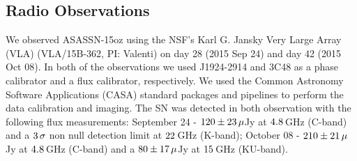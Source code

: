 \documentclass[a4paper,fleqn,usenatbib]{mnras}
\begin{document}
\subsection{Radio Observations}
We observed ASASSN-15oz using the NSF's Karl G. Jansky Very Large Array (VLA) (VLA/15B-362, PI: Valenti) on day 28 (2015 Sep 24) and day 42 (2015 Oct 08). 
In both of the observations we used J1924-2914 and 3C48 as a phase calibrator and a flux calibrator, respectively. 
We used the Common Astronomy Software Applications (CASA) standard packages and pipelines to perform the data calibration and imaging. 
The SN was detected in both observation with the following flux measurements: September 24 - $\rm{120\pm 23\,\mu}$Jy at $\rm{4.8}$\,GHz (C-band) and a $\rm{3\,\sigma}$ non null detection limit at $\rm{22}$\,GHz (K-band); October 08 -  $\rm{210\pm 21\,\mu}$Jy at $\rm{4.8}$\,GHz (C-band) and a $\rm{80\pm 17\,\mu}$Jy at $\rm{15}$\,GHz (KU-band). 
\end{document}
